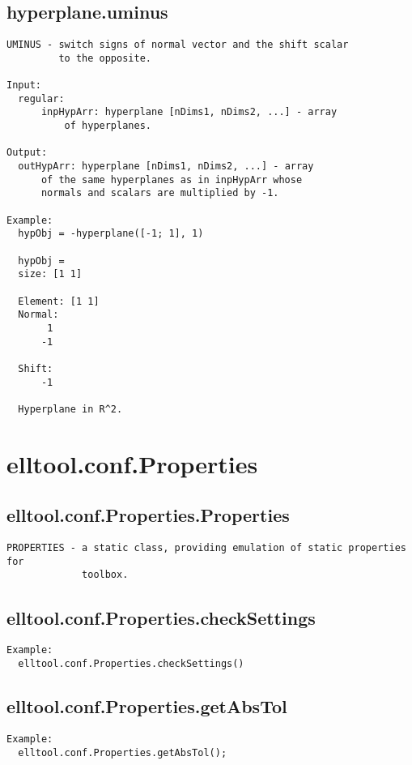 \subsection{\texorpdfstring{hyperplane.uminus}{uminus}}\label{method:hyperplane.uminus}
\begin{verbatim}
UMINUS - switch signs of normal vector and the shift scalar
         to the opposite.

Input:
  regular:
      inpHypArr: hyperplane [nDims1, nDims2, ...] - array
          of hyperplanes.

Output:
  outHypArr: hyperplane [nDims1, nDims2, ...] - array
      of the same hyperplanes as in inpHypArr whose
      normals and scalars are multiplied by -1.

Example:
  hypObj = -hyperplane([-1; 1], 1)

  hypObj =
  size: [1 1]

  Element: [1 1]
  Normal:
       1
      -1

  Shift:
      -1

  Hyperplane in R^2.
\end{verbatim}
\section{elltool.conf.Properties}\label{secClassDescr:elltool.conf.Properties}
\subsection{\texorpdfstring{elltool.conf.Properties.Properties}{Properties}}\label{method:elltool.conf.Properties.Properties}
\begin{verbatim}
PROPERTIES - a static class, providing emulation of static properties for
             toolbox.
\end{verbatim}
\subsection{\texorpdfstring{elltool.conf.Properties.checkSettings}{checkSettings}}\label{method:elltool.conf.Properties.checkSettings}
\begin{verbatim}
Example:
  elltool.conf.Properties.checkSettings()
\end{verbatim}
\subsection{\texorpdfstring{elltool.conf.Properties.getAbsTol}{getAbsTol}}\label{method:elltool.conf.Properties.getAbsTol}
\begin{verbatim}
Example:
  elltool.conf.Properties.getAbsTol();
\end{verbatim}
